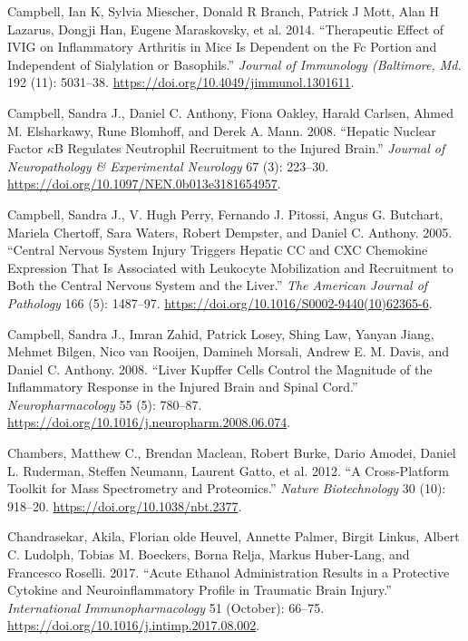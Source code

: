 \documentclass[9pt,lineno]{elife}
\newlength{\cslhangindent}
\newlength{\cslentryspacingunit} %
\newenvironment{CSLReferences}[2] %
 {%
  \setlength{\parindent}{0pt}
  \ifodd #1
  \let\oldpar\par
  \def\par{\hangindent=\cslhangindent\oldpar}
  \fi
  \setlength{\parskip}{#2\cslentryspacingunit}
 }%
 {}
\begin{document}
\begin{CSLReferences}{1}{0}
\leavevmode{}%
Campbell, Ian K, Sylvia Miescher, Donald R Branch, Patrick J Mott, Alan H Lazarus, Dongji Han, Eugene Maraskovsky, et al. 2014. {``Therapeutic Effect of {IVIG} on Inflammatory Arthritis in Mice Is Dependent on the {Fc} Portion and Independent of Sialylation or Basophils.''} \emph{Journal of Immunology (Baltimore, Md.} 192 (11): 5031--38. \url{https://doi.org/10.4049/jimmunol.1301611}.

\leavevmode{}%
Campbell, Sandra J., Daniel C. Anthony, Fiona Oakley, Harald Carlsen, Ahmed M. Elsharkawy, Rune Blomhoff, and Derek A. Mann. 2008. {``Hepatic {Nuclear Factor \(\kappa\)B Regulates Neutrophil Recruitment} to the {Injured Brain}.''} \emph{Journal of Neuropathology \& Experimental Neurology} 67 (3): 223--30. \url{https://doi.org/10.1097/NEN.0b013e3181654957}.

\leavevmode{}%
Campbell, Sandra J., V. Hugh Perry, Fernando J. Pitossi, Angus G. Butchart, Mariela Chertoff, Sara Waters, Robert Dempster, and Daniel C. Anthony. 2005. {``Central {Nervous System Injury Triggers Hepatic CC} and {CXC Chemokine Expression} That {Is Associated} with {Leukocyte Mobilization} and {Recruitment} to {Both} the {Central Nervous System} and the {Liver}.''} \emph{The American Journal of Pathology} 166 (5): 1487--97. \url{https://doi.org/10.1016/S0002-9440(10)62365-6}.

\leavevmode{}%
Campbell, Sandra J., Imran Zahid, Patrick Losey, Shing Law, Yanyan Jiang, Mehmet Bilgen, Nico van Rooijen, Damineh Morsali, Andrew E. M. Davis, and Daniel C. Anthony. 2008. {``Liver {Kupffer} Cells Control the Magnitude of the Inflammatory Response in the Injured Brain and Spinal Cord.''} \emph{Neuropharmacology} 55 (5): 780--87. \url{https://doi.org/10.1016/j.neuropharm.2008.06.074}.

\leavevmode{}%
Chambers, Matthew C., Brendan Maclean, Robert Burke, Dario Amodei, Daniel L. Ruderman, Steffen Neumann, Laurent Gatto, et al. 2012. {``A Cross-Platform Toolkit for Mass Spectrometry and Proteomics.''} \emph{Nature Biotechnology} 30 (10): 918--20. \url{https://doi.org/10.1038/nbt.2377}.

\leavevmode{}%
Chandrasekar, Akila, Florian olde Heuvel, Annette Palmer, Birgit Linkus, Albert C. Ludolph, Tobias M. Boeckers, Borna Relja, Markus Huber-Lang, and Francesco Roselli. 2017. {``Acute Ethanol Administration Results in a Protective Cytokine and Neuroinflammatory Profile in Traumatic Brain Injury.''} \emph{International Immunopharmacology} 51 (October): 66--75. \url{https://doi.org/10.1016/j.intimp.2017.08.002}.


\end{CSLReferences}
\end{document}
